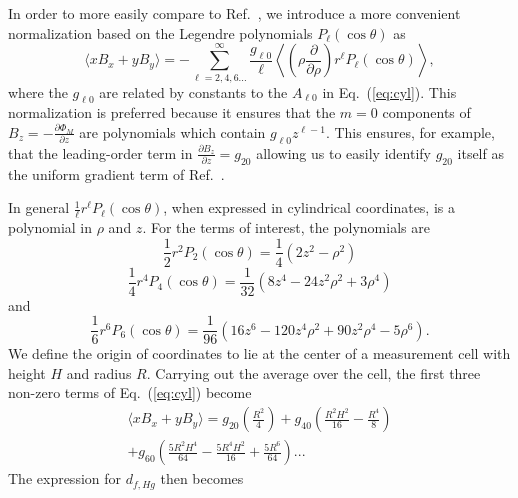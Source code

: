 \documentclass[preprint,12pt]{elsarticle}
\begin{document}
In order to more easily compare to Ref.~\cite{bib:pignol-roccia}, we
introduce a more convenient normalization based on the Legendre
polynomials $P_\ell(\cos\theta)$ as
\begin{equation}
    \langle xB_x+yB_y\rangle= -
    \sum_{\ell=2,4,6...}^{\infty}\frac{g_{\ell0}}{\ell}\left\langle\left(\rho\frac{\partial}{\partial
      \rho}\right)r^\ell P_\ell(\cos\theta)\right\rangle,
\end{equation}
where the $g_{\ell 0}$ are related by constants to the $A_{\ell 0}$ in
Eq.~(\ref{eq:cyl}).  This normalization is preferred because it
ensures that the $m=0$ components of
$B_{z}=-\frac{\partial\Phi_M}{\partial z}$ are polynomials which
contain $g_{\ell 0}z^{\ell-1}$.  This ensures, for example, that the
leading-order term in $\frac{\partial B_z}{\partial z}=g_{20}$
allowing us to easily identify $g_{20}$ itself as the uniform gradient
term of Ref.~\cite{bib:pignol-roccia}.


In general $\frac{1}{\ell}r^\ell P_\ell(\cos\theta)$, when expressed
in cylindrical coordinates, is a polynomial in $\rho$ and $z$.  For
the terms of interest, the polynomials are
\begin{equation}
\frac{1}{2}r^2P_2(\cos\theta)=\frac{1}{4}\left(2z^2-\rho^2\right)
\end{equation}
\begin{equation}
\frac{1}{4}r^4P_4(\cos\theta)=\frac{1}{32}\left(8z^{4}-24z^{2}\rho^{2}+3\rho^{4}\right)
\end{equation}
and
\begin{equation}
\frac{1}{6}r^6P_6(\cos\theta)=\frac{1}{96}\left(16z^{6}-120z^{4}\rho^{2}+90z^{2}\rho^{4}-5\rho^{6}\right).
\end{equation}
We define the origin of coordinates to lie at the center of a
measurement cell with height $H$ and radius $R$.  Carrying out the
average over the cell, the first three non-zero terms of
Eq.~(\ref{eq:cyl}) become
\begin{multline}
\label{eq:xbc}
  \langle
  xB_x+yB_y\rangle=g_{20}\left(\frac{R^{2}}{4}\right)+g_{40}\left(\frac{R^{2}H^{2}}{16}-\frac{R^{4}}{8}\right)\\
  +g_{60}\left(\frac{5R^{2}H^{4}}{64}-\frac{5R^{4}H^{2}}{16}+\frac{5R^{6}}{64}\right)...
\end{multline}
The expression for $d_{f,Hg}$ then becomes\\
\end{document}
